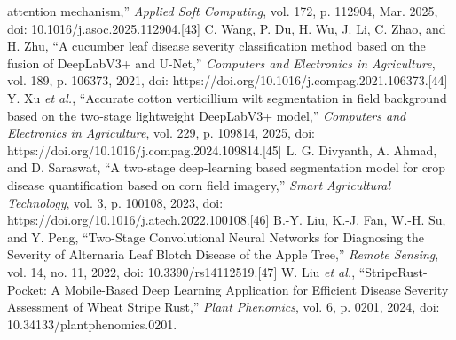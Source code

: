 \documentclass[
]{article}
\begin{document}
attention mechanism,'' \emph{Applied Soft Computing}, vol. 172, p.
112904, Mar. 2025, doi: 10.1016/j.asoc.2025.112904.{[}43{]} C. Wang, P.
Du, H. Wu, J. Li, C. Zhao, and H. Zhu, ``A cucumber leaf disease
severity classification method based on the fusion of DeepLabV3+ and
U-Net,'' \emph{Computers and Electronics in Agriculture}, vol. 189, p.
106373, 2021, doi: https://doi.org/10.1016/j.compag.2021.106373.{[}44{]}
Y. Xu \emph{et al.}, ``Accurate cotton verticillium wilt segmentation in
field background based on the two-stage lightweight DeepLabV3+ model,''
\emph{Computers and Electronics in Agriculture}, vol. 229, p. 109814,
2025, doi: https://doi.org/10.1016/j.compag.2024.109814.{[}45{]} L. G.
Divyanth, A. Ahmad, and D. Saraswat, ``A two-stage deep-learning based
segmentation model for crop disease quantification based on corn field
imagery,'' \emph{Smart Agricultural Technology}, vol. 3, p. 100108,
2023, doi: https://doi.org/10.1016/j.atech.2022.100108.{[}46{]} B.-Y.
Liu, K.-J. Fan, W.-H. Su, and Y. Peng, ``Two-Stage Convolutional Neural
Networks for Diagnosing the Severity of Alternaria Leaf Blotch Disease
of the Apple Tree,'' \emph{Remote Sensing}, vol. 14, no. 11, 2022, doi:
10.3390/rs14112519.{[}47{]} W. Liu \emph{et al.}, ``StripeRust-Pocket: A
Mobile-Based Deep Learning Application for Efficient Disease Severity
Assessment of Wheat Stripe Rust,'' \emph{Plant Phenomics}, vol. 6, p.
0201, 2024, doi: 10.34133/plantphenomics.0201.
\end{document}
